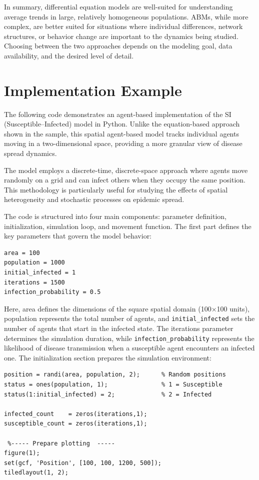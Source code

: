 \documentclass{article}
\begin{document}
In summary, differential equation models are well-suited for understanding average trends in large, relatively homogeneous populations. ABMs, while more complex, are better suited for situations where individual differences, network structures, or behavior change are important to the dynamics being studied. Choosing between the two approaches depends on the modeling goal, data availability, and the desired level of detail.

\section{Implementation Example}
The following code demonstrates an agent-based implementation of the SI (Susceptible–Infected) model in Python. Unlike the equation-based approach shown in the sample, this spatial agent-based model tracks individual agents moving in a two-dimensional space, providing a more granular view of disease spread dynamics.

The model employs a discrete-time, discrete-space approach where agents move randomly on a grid and can infect others when they occupy the same position. This methodology is particularly useful for studying the effects of spatial heterogeneity and stochastic processes on epidemic spread.

The code is structured into four main components: parameter definition, initialization, simulation loop, and movement function. The first part defines the key parameters that govern the model behavior:

\begin{lstlisting}[caption={Parameteres}]
area = 100
population = 1000
initial_infected = 1
iterations = 1500
infection_probability = 0.5
\end{lstlisting}

Here, area defines the dimensions of the square spatial domain (100×100 units), population represents the total number of agents, and \texttt{initial\_infected} sets the number of agents that start in the infected state. The iterations parameter determines the simulation duration, while \texttt{infection\_probability} represents the likelihood of disease transmission when a susceptible agent encounters an infected one.
The initialization section prepares the simulation environment:
\begin{lstlisting}[caption={Initialization}]
% ----- Initialization -----
position = randi(area, population, 2);      % Random positions
status = ones(population, 1);               % 1 = Susceptible
status(1:initial_infected) = 2;             % 2 = Infected

infected_count    = zeros(iterations,1);
susceptible_count = zeros(iterations,1);

 %----- Prepare plotting  -----
figure(1); 
set(gcf, 'Position', [100, 100, 1200, 500]);
tiledlayout(1, 2);

\end{lstlisting}
\end{document}
